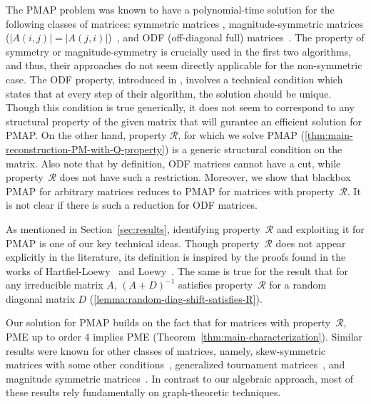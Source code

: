 \documentclass[11pt,letterpaper]{article}
\newcommand{\prop}{\mathcal{R}}
\begin{document}
{{{The PMAP problem was known to have a polynomial-time solution for the following classes of matrices: symmetric matrices \cite{Oeding2011-jo, RisingKuleszaTaskar2015}, magnitude-symmetric matrices ($|A(i,j)| = |A(j,i)|$)~\cite{Urschel2017,BrunelUrschel2024}, and ODF (off-diagonal full) matrices~\cite{GriffinTsatsomeros2006}.    
%
The property of symmetry or magnitude-symmetry is crucially used in the first two algorithms, and thus, their approaches do not seem directly applicable for the non-symmetric case.
%
The ODF property, introduced in \cite{GriffinTsatsomeros2006}, involves a technical condition which states that at every step of their algorithm, the solution should be unique.
%
Though this condition is true generically, it does not seem to correspond to any structural property of the given matrix that will gurantee an efficient solution for PMAP. 
%
On the other hand, property $\prop$, for which we solve PMAP (\cref{thm:main-reconstruction-PM-with-Q-property}) is a generic structural condition on the matrix.
%
Also note that by definition, ODF matrices cannot have a cut, while property~$\prop$ does not have such a restriction. 
%
Moreover, we show that blackbox PMAP for arbitrary matrices reduces to PMAP for matrices with property~$\prop$. 
%
It is not clear if there is such a reduction for ODF matrices.

As mentioned in Section~\ref{sec:results}, identifying property~$\prop$ and exploiting it for PMAP is one of our key technical ideas. 
%
Though property~$\prop$ does not appear explicitly in the literature, its definition is inspired by the proofs 
found in the works of Hartfiel-Loewy~\cite[Theorem 2]{Hartfiell84} and
Loewy~\cite[Lemma 6]{Loewy86}. 
%
The same is true for the result that for any irreducible matrix $A$, $(A+D)^{-1}$ satisfies property~$\prop$ for a random diagonal matrix $D$ (\cref{lemma:random-diag-shift-satisfies-R}).
%

Our solution for PMAP builds on  the fact that for matrices with property~$\prop$, PME up to order 4 implies PME (Theorem~\ref{thm:main-characterization}). 
Similar results were known for other classes of matrices, namely, skew-symmetric matrices with some other conditions~\cite{BC16, BOUSSAIRI201547}, generalized tournament matrices~\cite{BoussairiChaichaaCherguiLakhlifi2021}, and magnitude symmetric matrices~\cite{BrunelUrschel2024}. 
%
In contrast to our algebraic approach, most of these results rely fundamentally on graph-theoretic techniques.

}}}
\end{document}
